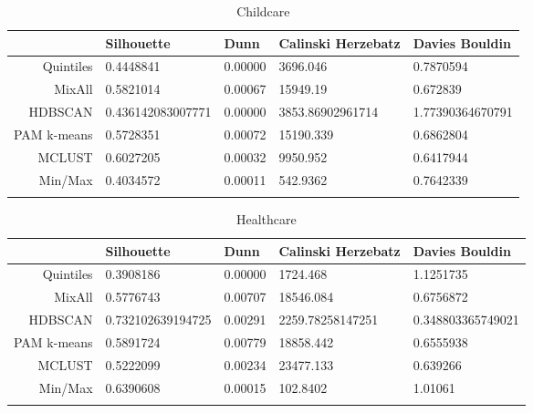 \documentclass[10pt, a4paper]{article}
\begin{document}
\begin{longtable}{rllll}
  \hline
 & Silhouette & Dunn & Calinski Herzebatz & Davies Bouldin \\ 
  \hline
Quintiles & 0.4448841 & 0.00000 & 3696.046 & 0.7870594 \\ 
   \hline
MixAll & 0.5821014 & 0.00067 & 15949.19 & 0.672839 \\ 
   \hline
HDBSCAN & 0.436142083007771 & 0.00000 & 3853.86902961714 & 1.77390364670791 \\ 
   \hline
PAM k-means & 0.5728351 & 0.00072 & 15190.339 & 0.6862804 \\ 
   \hline
MCLUST & 0.6027205 & 0.00032 & 9950.952 & 0.6417944 \\ 
   \hline
Min/Max & 0.4034572 & 0.00011 & 542.9362 & 0.7642339 \\ 
   \hline
\hline
\caption{Childcare} 
\end{longtable}





 \pagebreak 
 
\begin{longtable}{rllll}
  \hline
 & Silhouette & Dunn & Calinski Herzebatz & Davies Bouldin \\ 
  \hline
Quintiles & 0.3908186 & 0.00000 & 1724.468 & 1.1251735 \\ 
   \hline
MixAll & 0.5776743 & 0.00707 & 18546.084 & 0.6756872 \\ 
   \hline
HDBSCAN & 0.732102639194725 & 0.00291 & 2259.78258147251 & 0.348803365749021 \\ 
   \hline
PAM k-means & 0.5891724 & 0.00779 & 18858.442 & 0.6555938 \\ 
   \hline
MCLUST & 0.5222099 & 0.00234 & 23477.133 & 0.639266 \\ 
   \hline
Min/Max & 0.6390608 & 0.00015 & 102.8402 & 1.01061 \\ 
   \hline
\hline
\caption{Healthcare} 
\end{longtable}





 \pagebreak 
 
\end{document}
